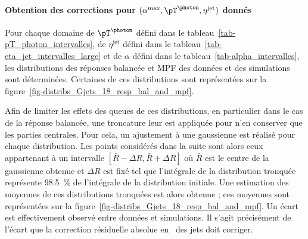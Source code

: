 \paragraph{Obtention des corrections pour $(\alpha^\text{max}, \pT^{\photon}, \eta^\text{jet})$ donnés}
Pour chaque domaine
de $\pT^{\photon}$ défini dans le tableau~\ref{tab-pT_photon_intervalles},
de $\eta^\text{jet}$ défini dans le tableau~\ref{tab-eta_jet_intervalles_large} et
de $\alpha$ défini dans le tableau~\ref{tab-alpha_intervalles},
les distributions des réponses balancée et MPF des données et des simulations sont déterminées.
Certaines de ces distributions sont représentées sur la figure~\ref{fig-distribs_Gjets_18_resp_bal_and_mpf}.
\par Afin de limiter les effets des queues de ces distributions, en particulier dans le cas de la réponse balancée,
une troncature leur est appliquée pour n'en conserver que les parties centrales.
Pour cela, un ajustement à une gaussienne est réalisé pour chaque distribution.
Les points considérés dans la suite sont alors ceux appartenant à un intervalle  $[ \bar{R} - \Delta R, \bar{R} + \Delta R ]$ où $\bar{R}$ est le centre de la gaussienne obtenue et $\Delta R$ est fixé tel que l'intégrale de la distribution tronquée représente \SI{98.5}{\%} de l'intégrale de la distribution initiale.
Une estimation des moyennes de ces distributions tronquées est alors obtenue ; ces moyennes sont représentées sur la figure~\ref{fig-distribs_Gjets_18_resp_bal_and_mpf}.
Un écart est effectivement observé entre données et simulations.
Il s'agit précisément de l'écart que la correction résiduelle absolue en \pT\ des jets doit corriger.
